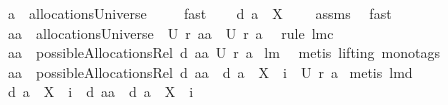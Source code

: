 \begin{isabellebody}
\ {\isachardoublequoteopen}a\ {\isasymin}\ allocationsUniverse{\isachardoublequoteclose}\ \isamarkupfalse%
\ {}\ \isamarkupfalse%
\ fast\ \isamarkupfalse%
\ \isamarkupfalse%
\ {\isachardoublequoteopen}{\isacharquery}d\ a\ {\isasyminter}\ X\ {\isasymnoteq}\ {\isacharbraceleft}{\isacharbraceright}{\isachardoublequoteclose}\ \isamarkupfalse%
\ assms\ \isamarkupfalse%
\ fast\ \isanewline
\ \ \isamarkupfalse%
\ \isamarkupfalse%
\ {\isachardoublequoteopen}{\isacharquery}aa\ {\isasymin}\ allocationsUniverse\ {\isacharampersand}\ {\isacharquery}U\ {\isacharparenleft}{\isacharquery}r\ {\isacharquery}aa{\isacharparenright}\ {\isacharequal}\ {\isacharquery}U\ {\isacharparenleft}{\isacharquery}r\ a{\isacharparenright}{\isachardoublequoteclose}\ \isamarkupfalse%
\ {\isacharparenleft}rule\ lm{}{}c{\isacharparenright}\ \isamarkupfalse%
\isanewline
\ \ \isamarkupfalse%
\ \isamarkupfalse%
\ {\isachardoublequoteopen}{\isacharquery}aa\ {\isasymin}\ possibleAllocationsRel\ {\isacharparenleft}{\isacharquery}d\ {\isacharquery}aa{\isacharparenright}\ {\isacharparenleft}{\isacharquery}U\ {\isacharparenleft}{\isacharquery}r\ a{\isacharparenright}{\isacharparenright}{\isachardoublequoteclose}\isanewline
{}\isamarkupfalse%
\ lm{}{}\ \isamarkupfalse%
\ {\isacharparenleft}metis\ {\isacharparenleft}lifting{\isacharcomma}\ mono{\isacharunderscore}tags{\isacharparenright}{\isacharparenright}\isanewline
{}\isamarkupfalse%
\ \isamarkupfalse%
\ {\isachardoublequoteopen}{\isacharquery}aa\ {\isasymin}\ possibleAllocationsRel\ {\isacharparenleft}{\isacharquery}d\ {\isacharquery}aa\ {\isasymunion}\ {\isacharparenleft}{\isacharquery}d\ a\ {\isacharminus}\ X\ {\isasymunion}\ {\isacharbraceleft}i{\isacharbraceright}{\isacharparenright}{\isacharparenright}\ \ {\isacharparenleft}{\isacharquery}U\ {\isacharparenleft}{\isacharquery}r\ a{\isacharparenright}{\isacharparenright}{\isachardoublequoteclose}\isanewline
{}\isamarkupfalse%
\ {\isacharparenleft}metis\ lm{}{}d{\isacharparenright}\isanewline
\ \ \isamarkupfalse%
\ \isamarkupfalse%
\ {\isachardoublequoteopen}{\isacharquery}d\ a\ {\isacharminus}\ X\ {\isasymunion}\ {\isacharbraceleft}i{\isacharbraceright}\ {\isacharequal}\ {\isacharquery}d\ {\isacharquery}aa\ {\isasymunion}\ {\isacharparenleft}{\isacharquery}d\ a\ {\isacharminus}\ X\ {\isasymunion}\ {\isacharbraceleft}i{\isacharbraceright}{\isacharparenright}{\isachardoublequoteclose}\ \isamarkupfalse%

\end{isabellebody}
